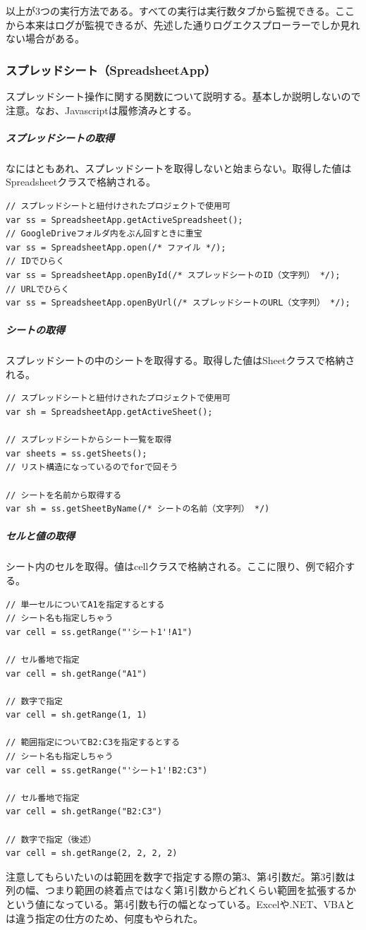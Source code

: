 \documentclass[dvipdfmx,jb5]{jreport}
\begin{document}
以上が3つの実行方法である。すべての実行は実行数タブから監視できる。ここから本来はログが監視できるが、先述した通りログエクスプローラーでしか見れない場合がある。

\subsubsection{スプレッドシート（SpreadsheetApp）}
スプレッドシート操作に関する関数について説明する。基本しか説明しないので注意。なお、Javascriptは履修済みとする。

\subparagraph{スプレッドシートの取得}
なにはともあれ、スプレッドシートを取得しないと始まらない。取得した値はSpreadsheetクラスで格納される。
\lstset{language=JavaScript}
\begin{lstlisting}
// スプレッドシートと紐付けされたプロジェクトで使用可
var ss = SpreadsheetApp.getActiveSpreadsheet();
// GoogleDriveフォルダ内をぶん回すときに重宝
var ss = SpreadsheetApp.open(/* ファイル */);
// IDでひらく
var ss = SpreadsheetApp.openById(/* スプレッドシートのID（文字列） */);
// URLでひらく
var ss = SpreadsheetApp.openByUrl(/* スプレッドシートのURL（文字列） */);
\end{lstlisting}

\subparagraph{シートの取得}
スプレッドシートの中のシートを取得する。取得した値はSheetクラスで格納される。
\begin{lstlisting}
// スプレッドシートと紐付けされたプロジェクトで使用可
var sh = SpreadsheetApp.getActiveSheet();

// スプレッドシートからシート一覧を取得
var sheets = ss.getSheets();
// リスト構造になっているのでforで回そう

// シートを名前から取得する
var sh = ss.getSheetByName(/* シートの名前（文字列） */)
\end{lstlisting}

\subparagraph{セルと値の取得}
シート内のセルを取得。値はcellクラスで格納される。ここに限り、例で紹介する。
\begin{lstlisting}
// 単一セルについてA1を指定するとする
// シート名も指定しちゃう
var cell = ss.getRange("'シート1'!A1")

// セル番地で指定
var cell = sh.getRange("A1")

// 数字で指定
var cell = sh.getRange(1, 1)

// 範囲指定についてB2:C3を指定するとする
// シート名も指定しちゃう
var cell = ss.getRange("'シート1'!B2:C3")

// セル番地で指定
var cell = sh.getRange("B2:C3")

// 数字で指定（後述）
var cell = sh.getRange(2, 2, 2, 2)

\end{lstlisting}
注意してもらいたいのは範囲を数字で指定する際の第3、第4引数だ。第3引数は列の幅、つまり範囲の終着点ではなく第1引数からどれくらい範囲を拡張するかという値になっている。第4引数も行の幅となっている。Excelや.NET、VBAとは違う指定の仕方のため、何度もやられた。
\end{document}
